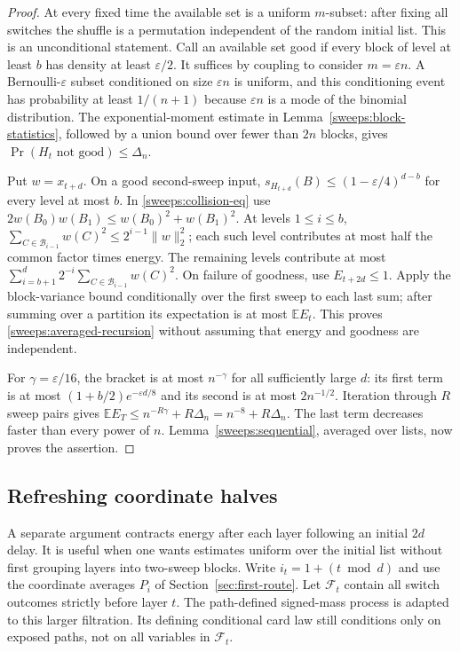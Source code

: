 \begin{proof}
At every fixed time the available set is a uniform $m$-subset: after fixing all
switches the shuffle is a permutation independent of the random initial list.
This is an unconditional statement.  Call an available set good if every block
of level at least $b$ has density at least $\varepsilon/2$.  It suffices by
coupling to consider $m=\varepsilon n$.  A Bernoulli-$\varepsilon$ subset
conditioned on size $\varepsilon n$ is uniform, and this conditioning event
has probability at least $1/(n+1)$ because $\varepsilon n$ is a mode of the
binomial distribution.  The exponential-moment estimate in
Lemma~\ref{sweeps:block-statistics}, followed by a union bound over fewer
than $2n$ blocks, gives $\Pr(H_t\text{ not good})\le\Delta_n$.

Put $w=x_{t+d}$.  On a good second-sweep input,
$s_{H_{t+d}}(B)\le(1-\varepsilon/4)^{d-b}$ for every level at most $b$.
In \eqref{sweeps:collision-eq} use $2w(B_0)w(B_1)\le w(B_0)^2+w(B_1)^2$.
At levels $1\le i\le b$,
$\sum_{C\in\mathcal B_{i-1}}w(C)^2\le2^{i-1}\|w\|_2^2$;
each such level contributes at most half the common factor times energy.
The remaining levels contribute at most
$\sum_{i=b+1}^d2^{-i}\sum_{C\in\mathcal B_{i-1}}w(C)^2$.
On failure of goodness, use $E_{t+2d}\le1$.  Apply the block-variance bound
conditionally over the first sweep to each last sum; after summing over a
partition its expectation is at most $\mathbb E E_t$.  This proves
\eqref{sweeps:averaged-recursion} without assuming that energy and goodness
are independent.

For $\gamma=\varepsilon/16$, the bracket is at most $n^{-\gamma}$ for all
sufficiently large $d$: its first term is at most
$(1+b/2)e^{-\varepsilon d/8}$ and its second is at most $2n^{-1/2}$.
Iteration through $R$ sweep pairs gives
$\mathbb E E_T\le n^{-R\gamma}+R\Delta_n=n^{-8}+R\Delta_n$.
The last term decreases faster than every power of $n$.
Lemma~\ref{sweeps:sequential}, averaged over lists, now proves the assertion.
\end{proof}

\subsection{Refreshing coordinate halves}\label{sweeps:refresh-section}
A separate argument contracts energy after each layer following an initial
$2d$ delay.  It is useful when one wants estimates uniform over the initial
list without first grouping layers into two-sweep blocks.
Write $i_t=1+(t\bmod d)$ and use the coordinate averages $P_i$
of Section~\ref{sec:first-route}.
Let $\mathcal F_t$ contain all switch outcomes strictly before layer $t$.
The path-defined signed-mass process is adapted to this larger filtration.
Its defining conditional card law still conditions only on exposed paths,
not on all variables in $\mathcal F_t$.

